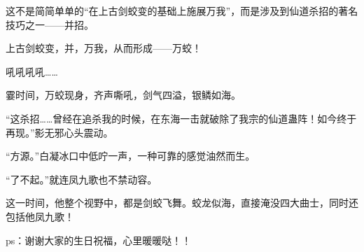 \begin{this_body}
这不是简简单单的“在上古剑蛟变的基础上施展万我”，而是涉及到仙道杀招的著名技巧之一——并招。

上古剑蛟变，并，万我，从而形成——万蛟！

吼吼吼吼……

霎时间，万蛟现身，齐声嘶吼，剑气四溢，银鳞如海。

“这杀招……曾经在追杀我的时候，在东海一击就破除了我宗的仙道蛊阵！如今终于再现。”影无邪心头震动。

“方源。”白凝冰口中低咛一声，一种可靠的感觉油然而生。

“了不起。”就连凤九歌也不禁动容。

这一时间，他整个视野中，都是剑蛟飞舞。蛟龙似海，直接淹没四大曲士，同时还包括他凤九歌！

ps：谢谢大家的生日祝福，心里暖暖哒！！

\end{this_body}

